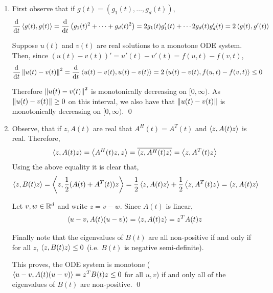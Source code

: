 \documentclass[10pt]{article}
\begin{document}
\begin{solution}[Solution]


\begin{enumerate}[label=(\alph*)]
    \item First observe that if \( g(t) = (g_1(t), \ldots, g_d(t)) \),
    \begin{align*}
        \frac{\mathrm{d}^{}}{\mathrm{d} t^{}} \left\langle g(t),g(t) \right\rangle = \frac{\mathrm{d}^{}}{\mathrm{d} t^{}} \left(g_1(t)^2 + \cdots + g_d(t)^2\right) = 2g_1(t)g_1'(t) + \cdots 2g_d(t)g_d'(t) = 2\left\langle g(t),g'(t) \right\rangle
    \end{align*}

    Suppose \( u(t) \) and \( v(t) \) are real solutions to a monotone ODE system. Then, since \( (u(t)-v(t))' = u'(t) -v'(t) = f(u,t) - f(v,t) \),
    \begin{align*}
    \frac{\mathrm{d}^{}}{\mathrm{d} t^{}} \left\lVert u(t)-v(t)\right\rVert^2
    &= \frac{\mathrm{d}^{}}{\mathrm{d} t^{}} \left\langle u(t)-v(t),u(t)-v(t) \right\rangle
    = 2\left\langle u(t)-v(t), f(u,t) - f(v,t) \right\rangle
    \leq 0
    \end{align*}

    Therefore \( \left\lVert u(t)-v(t)\right\rVert^2 \) is monotonically decreasing on \( [0,\infty) \). As \( \left\lVert u(t)-v(t)\right\rVert\geq 0 \) on this interval, we also have that \( \left\lVert u(t)-v(t)\right\rVert \) is monotonically decreasing on \( [0,\infty) \). \qed

    \item
    Observe, that if \( z,A(t) \) are real that \( A^H(t) = A^T(t) \) and \( \left\langle z,A(t)z \right\rangle \) is real. Therefore,
    \begin{align*}
        \left\langle z,A(t)z \right\rangle = \left\langle A^H(t)z,z \right\rangle = \overline{\left\langle z,A^H(t)z \right\rangle} = \left\langle z,A^T(t)z \right\rangle
    \end{align*}
    Using the above equality it is clear that,
    \begin{align*}
        \left\langle z,B(t)z \right\rangle =  \left\langle z,\frac{1}{2}(A(t)+A^T(t))z \right\rangle = \dfrac{1}{2}\left\langle z,A(t)z \right\rangle + \dfrac{1}{2}\left\langle z,A^T(t)z \right\rangle = \left\langle z,A(t)z \right\rangle
    \end{align*}

    Let \( v,w \in \mathbb{R}^d \) and write \( z = v-w \). Since \( A(t) \) is linear,
    \begin{align*}
       \left\langle u-v,A(t)(u-v) \right\rangle = \left\langle z,A(t)z \right\rangle = z^TA(t)z
    \end{align*}

    Finally note that the eigenvalues of \( B(t) \) are all non-positive if and only if for all \( z \), \( \left\langle z,B(t)z \right\rangle \leq 0 \) (i.e. \( B(t) \) is negative semi-definite).

    This proves, the ODE system is monotone (\( \left\langle u-v,A(t)(u-v) \right\rangle = z^TB(t)z \leq 0 \) for all \( u,v \)) if and only all of the eigenvalues of \( B(t) \) are non-positive. \qed



\end{enumerate}
\end{solution}
\end{document}
